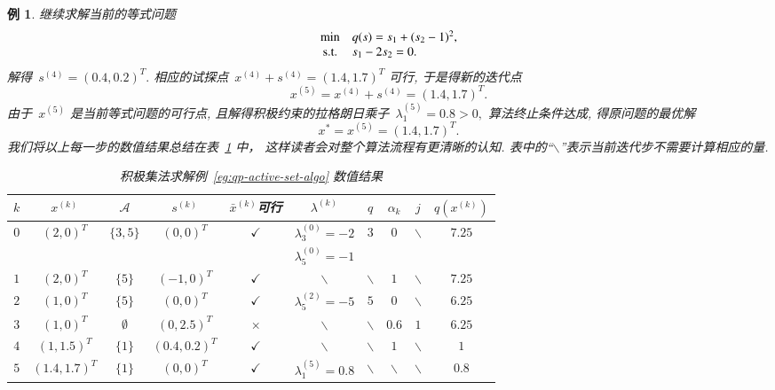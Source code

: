 \documentclass{SBCbookchapter}
\newtheorem{exam}[thm]{例}
\numberwithin{equation}{section}
\begin{document}
\begin{exam}
继续求解当前的等式问题
\begin{equation*}
\begin{array}{cl}
\min & q({s}) = s_1 + (s_2 - 1)^2, \\
{\rm s.t.} & s_1 - 2s_2 = 0.
\end{array}
\end{equation*}
解得~${s}^{(4)} = (0.4, 0.2)^T.$ 相应的试探点~${x}^{(4)} + {s}^{(4)} = (1.4, 1.7)^T$ 可行, 于是得新的迭代点
\begin{equation*}
{x}^{(5)} = {x}^{(4)} + {s}^{(4)} = (1.4, 1.7)^T.
\end{equation*}
由于~${x}^{(5)}$ 是当前等式问题的可行点, 且解得积极约束的拉格朗日乘子~$\lambda_1^{(5)} = 0.8 > 0,$ 算法终止条件达成, 得原问题的最优解
\begin{equation*}
{x}^* = {x}^{(5)} = (1.4, 1.7)^T.
\end{equation*}
我们将以上每一步的数值结果总结在表~\ref{tab:active-set-eg} 中， 这样读者会对整个算法流程有更清晰的认知. 表中的``$\backslash$''表示当前迭代步不需要计算相应的量.
\begin{table}[H]
    \caption{积极集法求解例~\ref{eg:qp-active-set-algo} 数值结果}
    \label{tab:active-set-eg}
    \centering
    \begin{tabular}{cccccccccc}
    \hline
    $k$ & ${x}^{(k)}$ & $\mathcal{A}$ & ${s}^{(k)}$ & $\bar{{x}}^{(k)}$可行 & ${\lambda}^{(k)}$ & $q$ & $\alpha_k$ & $j$ & $q({x}^{(k)})$ \\
    \hline
    \multirow{2}{*}{$0$} & \multirow{2}{*}{$(2, 0)^T$} & \multirow{2}{*}{$\{ 3, 5 \}$} & \multirow{2}{*}{$(0, 0)^T$} & \multirow{2}{*}{$\checkmark$} & $\lambda_3^{(0)} = -2$ & \multirow{2}{*}{$3$} & \multirow{2}{*}{$0$} & \multirow{2}{*}{$\backslash$} & \multirow{2}{*}{$7.25$} \\
    & & & & & $\lambda_5^{(0)} = -1$ & & & \\
    $1$ & $(2, 0)^T$ & $\{ 5 \}$ & $(-1, 0)^T$ & $\checkmark$ & $\backslash$ & $\backslash$ & $1$ & $\backslash$ & $7.25$ \\
    $2$ & $(1, 0)^T$ & $\{ 5 \}$ & $(0, 0)^T$ & $\checkmark$ & $\lambda_5^{(2)} = -5$ & $5$ & $0$ & $\backslash$ & $6.25$ \\
    $3$ & $(1, 0)^T$ & $\emptyset$ & $(0, 2.5)^T$ & $\times$ & $\backslash$ & $\backslash$ & $0.6$ & $1$ & $6.25$ \\
    $4$ & $(1, 1.5)^T$ & $\{ 1 \}$ & $(0.4, 0.2)^T$ & $\checkmark$ & $\backslash$ & $\backslash$ & $1$ & $\backslash$ & $1$ \\
    $5$ & $(1.4, 1.7)^T$ & $\{ 1 \}$ & $(0, 0)^T$ & $\checkmark$ & $\lambda_1^{(5)} = 0.8$ & $\backslash$ & $\backslash$ & $\backslash$ & $0.8$ \\
    \hline
    \end{tabular}
\end{table}
\end{exam}
\end{document}
